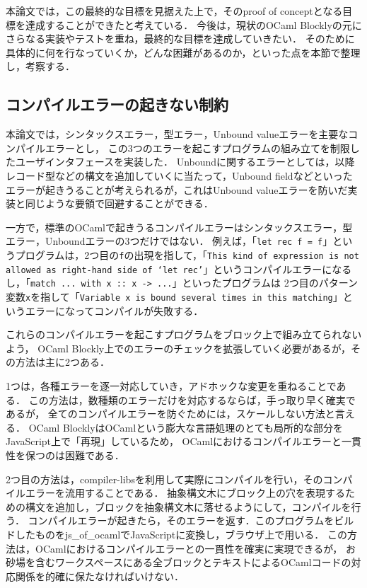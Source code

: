 本論文では，この最終的な目標を見据えた上で，そのproof of conceptとなる目標を達成することができたと考えている．
今後は，現状のOCaml Blocklyの元にさらなる実装やテストを重ね，最終的な目標を達成していきたい．
そのために具体的に何を行なっていくか，どんな困難があるのか，といった点を本節で整理し，考察する．

\subsection*{コンパイルエラーの起きない制約}

本論文では，シンタックスエラー，型エラー，Unbound valueエラーを主要なコンパイルエラーとし，
この3つのエラーを起こすプログラムの組み立てを制限したユーザインタフェースを実装した．
Unboundに関するエラーとしては，以降レコード型などの構文を追加していくに当たって，Unbound fieldなどといったエラーが起きうることが考えられるが，これはUnbound valueエラーを防いだ実装と同じような要領で回避することができる．

一方で，標準のOCamlで起きうるコンパイルエラーはシンタックスエラー，型エラー，Unboundエラーの3つだけではない．
例えば，「{\tt let rec f = f}」というプログラムは，2つ目の{\tt f}の出現を指して，「{\tt This kind of expression is not allowed as right-hand side of `let rec'}」というコンパイルエラーになるし，「{\tt match ... with x ::\ x -> ...}」といったプログラムは
2つ目のパターン変数{\tt x}を指して「{\tt Variable x is bound several times in this matching}」というエラーになってコンパイルが失敗する．

これらのコンパイルエラーを起こすプログラムをブロック上で組み立てられないよう，
OCaml Blockly上でのエラーのチェックを拡張していく必要があるが，その方法は主に2つある．

1つは，各種エラーを逐一対応していき，アドホックな変更を重ねることである．
この方法は，数種類のエラーだけを対応するならば，手っ取り早く確実であるが，
全てのコンパイルエラーを防ぐためには，スケールしない方法と言える．
OCaml BlocklyはOCamlという膨大な言語処理のとても局所的な部分をJavaScript上で「再現」しているため，
OCamlにおけるコンパイルエラーと一貫性を保つのは困難である．

2つ目の方法は，compiler-libsを利用して実際にコンパイルを行い，そのコンパイルエラーを流用することである．
抽象構文木にブロック上の穴を表現するための構文を追加し，ブロックを抽象構文木に落せるようにして，コンパイルを行う．
コンパイルエラーが起きたら，そのエラーを返す．このプログラムをビルドしたものをjs\_of\_ocamlでJavaScriptに変換し，ブラウザ上で用いる．
この方法は，OCamlにおけるコンパイルエラーとの一貫性を確実に実現できるが，
お砂場を含むワークスペースにある全ブロックとテキストによるOCamlコードの対応関係を的確に保たなければいけない．

